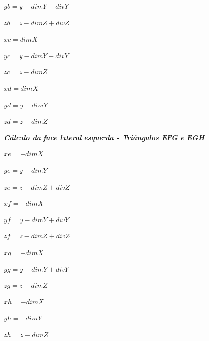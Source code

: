 \documentclass[12pt]{article}
\begin{document}
\par$yb = y - dimY + divY$ \newline
\par$zb = z - dimZ + divZ$ \newline\newline
\par$xc = dimX$ \newline
\par$yc = y - dimY + divY$ \newline
\par$zc = z - dimZ$ \newline\newline
\par$xd = dimX$ \newline
\par$yd = y - dimY$ \newline
\par$zd = z - dimZ$ \newline\newline
\par\textit{\textbf{Cálculo da face lateral esquerda - Triângulos EFG e EGH}} \newline
\par$xe = -dimX$ \newline
\par$ye = y - dimY$ \newline
\par$ze = z-dimZ+divZ$ \newline\newline
\par$xf = -dimX$ \newline
\par$yf = y - dimY + divY$ \newline
\par$zf = z-dimZ+divZ$ \newline\newline
\par$xg = -dimX$ \newline
\par$yg = y - dimY + divY$ \newline
\par$zg = z - dimZ$ \newline\newline
\par$xh = -dimX$ \newline
\par$yh = -dimY$ \newline
\par$zh = z - dimZ$ \newline\newline
\end{document}
